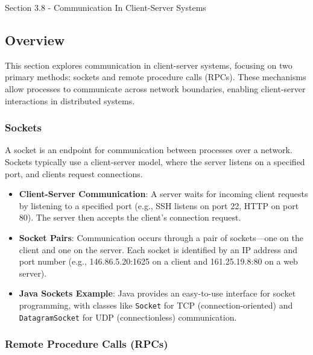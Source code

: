 \begin{notes}{Section 3.8 - Communication In Client-Server Systems}
    \subsection*{Overview}

    This section explores communication in client-server systems, focusing on two primary methods: sockets and remote procedure calls (RPCs). These mechanisms allow processes to communicate across network 
    boundaries, enabling client-server interactions in distributed systems.
    
    \subsubsection*{Sockets}
    
    A socket is an endpoint for communication between processes over a network. Sockets typically use a client-server model, where the server listens on a specified port, and clients request connections.
    
    \begin{highlight}[Sockets]
    
        \begin{itemize}
            \item \textbf{Client-Server Communication}: A server waits for incoming client requests by listening to a specified port (e.g., SSH listens on port 22, HTTP on port 80). The server then 
            accepts the client's connection request.
            \item \textbf{Socket Pairs}: Communication occurs through a pair of sockets—one on the client and one on the server. Each socket is identified by an IP address and port number 
            (e.g., 146.86.5.20:1625 on a client and 161.25.19.8:80 on a web server).
            \item \textbf{Java Sockets Example}: Java provides an easy-to-use interface for socket programming, with classes like \texttt{Socket} for TCP (connection-oriented) and \texttt{DatagramSocket} 
            for UDP (connectionless) communication.
        \end{itemize}
    
    \end{highlight}
    
    \subsubsection*{Remote Procedure Calls (RPCs)}
    

\end{notes}
